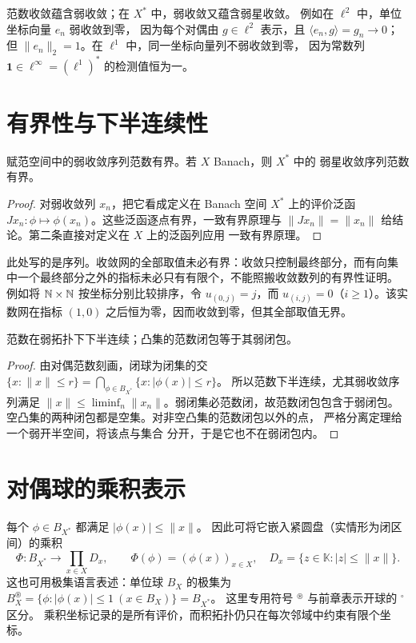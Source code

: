 范数收敛蕴含弱收敛；在 \(X^*\) 中，弱收敛又蕴含弱星收敛。
例如在 \(\ell^2\) 中，单位坐标向量 \(e_n\) 弱收敛到零，
因为每个对偶由 \(g\in\ell^2\) 表示，且 \(\langle e_n,g\rangle=g_n\to0\)；
但 \(\|e_n\|_2=1\)。在 \(\ell^1\) 中，同一坐标向量列不弱收敛到零，
因为常数列 \(\mathbf1\in\ell^\infty=(\ell^1)^*\) 的检测值恒为一。

\section{有界性与下半连续性}

\begin{proposition}\label{prop:weak-sequence-bounded}
赋范空间中的弱收敛序列范数有界。若 \(X\) Banach，则 \(X^*\) 中的
弱星收敛序列范数有界。
\end{proposition}
\begin{proof}
对弱收敛列 \(x_n\)，把它看成定义在 Banach 空间 \(X^*\) 上的评价泛函
\(Jx_n:\phi\mapsto\phi(x_n)\)。这些泛函逐点有界，一致有界原理与
\(\|Jx_n\|=\|x_n\|\) 给结论。第二条直接对定义在 \(X\) 上的泛函列应用
一致有界原理。
\end{proof}

此处写的是序列。收敛网的全部取值未必有界：收敛只控制最终部分，而有向集
中一个最终部分之外的指标未必只有有限个，不能照搬收敛数列的有界性证明。
例如将 \(\mathbb{N}\times\mathbb{N}\) 按坐标分别比较排序，令
\(u_{(0,j)}=j\)，而 \(u_{(i,j)}=0\)（\(i\ge1\)）。该实数网在指标
\((1,0)\) 之后恒为零，因而收敛到零，但其全部取值无界。

\begin{proposition}\label{prop:weak-lower-semicontinuity}
范数在弱拓扑下下半连续；凸集的范数闭包等于其弱闭包。
\end{proposition}
\begin{proof}
由对偶范数刻画，闭球为闭集的交
\(\{x:\|x\|\le r\}=\bigcap_{\phi\in B_{X^*}}\{x:|\phi(x)|\le r\}\)。
所以范数下半连续，尤其弱收敛序列满足
\(\|x\|\le\liminf_n\|x_n\|\)。弱闭集必范数闭，故范数闭包包含于弱闭包。
空凸集的两种闭包都是空集。对非空凸集的范数闭包以外的点，
严格分离定理给一个弱开半空间，将该点与集合
分开，于是它也不在弱闭包内。
\end{proof}

\section{对偶球的乘积表示}

每个 \(\phi\in B_{X^*}\) 都满足 \(|\phi(x)|\le\|x\|\)。
因此可将它嵌入紧圆盘（实情形为闭区间）的乘积
\[
 \Phi:B_{X^*}\longrightarrow\prod_{x\in X}D_x,\qquad
 \Phi(\phi)=(\phi(x))_{x\in X},\quad
 D_x=\{z\in\mathbb K:|z|\le\|x\|\}.
\]
这也可用极集语言表述：单位球 \(B_X\) 的极集为
\(B_X^\circledast=\{\phi:|\phi(x)|\le1\ (x\in B_X)\}=B_{X^*}\)。
这里专用符号 \({}^\circledast\) 与前章表示开球的 \({}^\circ\) 区分。
乘积坐标记录的是所有评价，而积拓扑仍只在每次邻域中约束有限个坐标。


